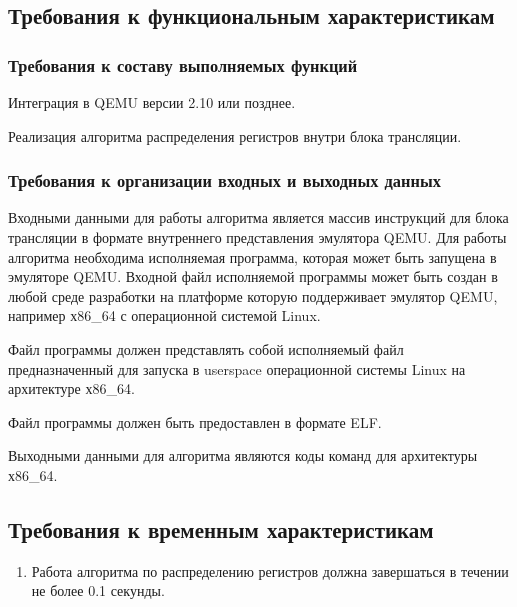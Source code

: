 

\subsection{Требования к функциональным характеристикам}
\subsubsection{Требования к составу выполняемых функций}
\begin{my_enumerate}
\item Интеграция в QEMU версии 2.10 или позднее.
\item Реализация алгоритма распределения регистров внутри блока трансляции.
\end{my_enumerate}

\subsubsection{Требования к организации входных и выходных данных}
Входными данными для работы алгоритма является массив инструкций для блока трансляции в формате внутреннего представления эмулятора QEMU. Для работы алгоритма необходима исполняемая программа, которая может быть запущена в эмуляторе QEMU. Входной файл исполняемой программы может быть создан в любой среде разработки на платформе которую поддерживает эмулятор QEMU, например х86\_64 с операционной системой Linux.

\begin{my_enumerate}
\item Файл программы должен представлять собой исполняемый файл предназначенный для запуска в userspace операционной системы Linux на архитектуре х86\_64.
\item Файл программы должен быть предоставлен в формате ELF.
\end{my_enumerate}

\medskip
Выходными данными для алгоритма являются коды команд для архитектуры х86\_64.


\subsection{Требования к временным характеристикам}
\begin{enumerate}
\item Работа алгоритма по распределению регистров должна завершаться в течении не более 0.1 секунды.
\end{enumerate}


